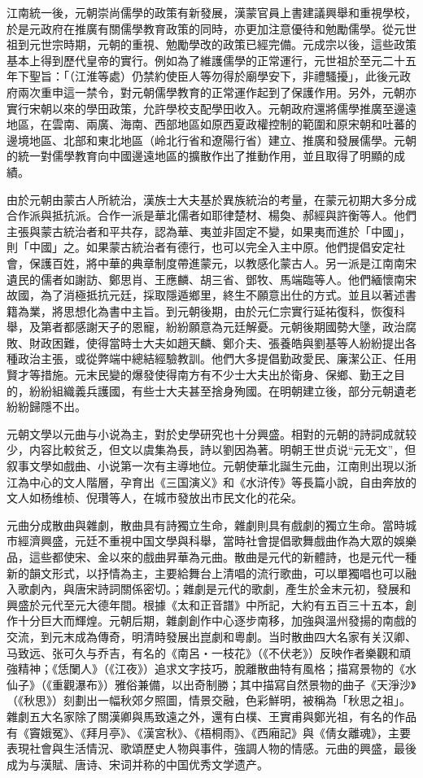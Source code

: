 江南統一後，元朝崇尚儒學的政策有新發展，漢蒙官員上書建議興舉和重視學校，於是元政府在推廣有關儒學教育政策的同時，亦更加注意優待和勉勵儒學。從元世祖到元世宗時期，元朝的重視、勉勵學改的政策已經完備。元成宗以後，這些政策基本上得到歷代皇帝的實行。例如為了維護儒學的正常運行，元世祖於至元二十五年下聖旨：「（江淮等處）仍禁約使臣人等勿得於廟學安下，非禮騷擾」，此後元政府兩次重申這一禁令，對元朝儒學教育的正常運作起到了保護作用。另外，元朝亦實行宋朝以來的學田政策，允許學校支配學田收入。元朝政府還將儒學推廣至邊遠地區，在雲南、兩廣、海南、西部地區如原西夏政權控制的範圍和原宋朝和吐蕃的邊境地區、北部和東北地區（岭北行省和遼陽行省）建立、推廣和發展儒學。元朝的統一對儒學教育向中國邊遠地區的擴散作出了推動作用，並且取得了明顯的成績。

由於元朝由蒙古人所統治，漢族士大夫基於異族統治的考量，在蒙元初期大多分成合作派與抵抗派。合作一派是華北儒者如耶律楚材、楊奐、郝經與許衡等人。他們主張與蒙古統治者和平共存，認為華、夷並非固定不變，如果夷而進於「中國」，則「中國」之。如果蒙古統治者有德行，也可以完全入主中原。他們提倡安定社會，保護百姓，將中華的典章制度帶進蒙元，以教感化蒙古人。另一派是江南南宋遺民的儒者如謝訪、鄭思肖、王應麟、胡三省、鄧牧、馬端臨等人。他們緬懷南宋故國，為了消極抵抗元廷，採取隱遁鄉里，終生不願意出仕的方式。並且以著述書籍為業，將思想化為書中主旨。到元朝後期，由於元仁宗實行延祐復科，恢復科舉，及第者都感謝天子的恩寵，紛紛願意為元廷解憂。元朝後期國勢大墬，政治腐敗、財政困難，使得當時士大夫如趙天麟、鄭介夫、張養皓與劉基等人紛紛提出各種政治主張，或從弊端中總結經驗教訓。他們大多提倡勤政愛民、廉潔公正、任用賢才等措施。元末民變的爆發使得南方有不少士大夫出於衛身、保鄉、勤王之目的，紛紛組織義兵護國，有些士大夫甚至捨身殉國。在明朝建立後，部分元朝遺老紛紛歸隱不出。

元朝文學以元曲与小说為主，對於史學研究也十分興盛。相對的元朝的詩詞成就较少，内容比較贫乏，但文以虞集為長，詩以劉因為著。明朝王世贞说“元无文”，但叙事文學如戲曲、小说第一次有主導地位。元朝使華北誕生元曲，江南則出現以浙江為中心的文人階層，孕育出《三国演义》和《水浒传》等長篇小說，自由奔放的文人如杨维桢、倪瓚等人，在城市發放出市民文化的花朵。

元曲分成散曲與雜劇，散曲具有詩獨立生命，雜劇則具有戲劇的獨立生命。當時城市經濟興盛，元廷不重視中国文學與科舉，當時社會提倡歌舞戲曲作為大眾的娛樂品，這些都使宋、金以來的戲曲昇華為元曲。散曲是元代的新體詩，也是元代一種新的韻文形式，以抒情為主，主要給舞台上清唱的流行歌曲，可以單獨唱也可以融入歌劇內，與唐宋詩詞關係密切。；雜劇是元代的歌劇，產生於金末元初，發展和興盛於元代至元大德年間。根據《太和正音譜》中所記，大約有五百三十五本，創作十分巨大而輝煌。元朝后期，雜劇創作中心逐步南移，加強與溫州發揚的南戲的交流，到元末成為傳奇，明清時發展出崑劇和粵劇。当时散曲四大名家有关汉卿、马致远、张可久与乔吉，有名的《南呂‧一枝花》（《不伏老》）反映作者樂觀和頑強精神；《恁闌人》（《江夜》）追求文字技巧，脫離散曲特有風格；描寫景物的《水仙子》（《重觀瀑布》）雅俗兼備，以出奇制勝；其中描寫自然景物的曲子《天淨沙》（《秋思》）刻劃出一幅秋郊夕照圖，情景交融，色彩鮮明，被稱為「秋思之祖」。雜劇五大名家除了關漢卿與馬致遠之外，還有白樸、王實甫與鄭光祖，有名的作品有《竇娥冤》、《拜月亭》、《漢宮秋》、《梧桐雨》、《西廂記》與《倩女離魂》，主要表現社會與生活情況、歌頌歷史人物與事件，強調人物的情感。元曲的興盛，最後成为与漢賦、唐诗、宋词并称的中国优秀文学遗产。

